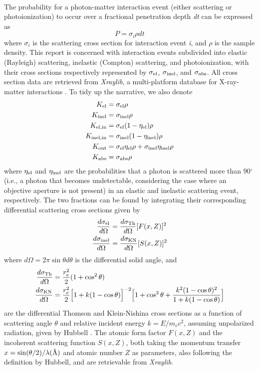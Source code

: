 \documentclass[review]{elsarticle}
\newcommand\el{\textup{\scriptsize{el}}}
\newcommand\inel{\textup{\scriptsize{inel}}}
\newcommand\elin{\textup{\scriptsize{el,in}}}
\newcommand\inelin{\textup{\scriptsize{inel,in}}}
\newcommand\out{\textup{\scriptsize{out}}}
\newcommand\PI{\textup{\scriptsize{abs}}}
\newcommand\Th{\textup{\scriptsize{Th}}}
\newcommand\KN{\textup{\scriptsize{KN}}}
\newcommand\angstrom{\mbox{\normalfont\AA}}
\begin{document}
\paragraph{} The probability for a photon-matter interaction event (either scattering or photoionization) to occur over a fractional penetration depth \textit{dt} can be expressed as
\begin{equation}
P = \sigma_{i} \rho dt
\end{equation}
where $\sigma_{i}$ is the scattering cross section for interaction event \textit{i}, and $\rho$ is the sample density. This report is concerned with interaction events subdivided into elastic (Rayleigh) scattering, inelastic (Compton) scattering, and photoionization, with their cross sections respectively represented by $\sigma_{\el}$, $\sigma_{\inel}$, and $\sigma_{\PI}$. All cross section data are retrieved from \textit{Xraylib}, a multi-platform database for X-ray-matter interactions \cite{Schoonjans:2011km}. To tidy up the narrative, we also denote
\begin{align}
K_{\el} &= \sigma_{\el}\rho \\
K_{\inel} &= \sigma_{\inel}\rho \\
K_{\elin} &= \sigma_{\el}(1-\eta_\el)\rho \\
K_{\inelin} &= \sigma_{\inel}(1-\eta_\inel)\rho
\label{eq:inelin} \\
K_{\out} &= \sigma_{\el}\eta_\el\rho + \sigma_{\inel}\eta_\inel\rho \\
K_{\PI} &= \sigma_{\PI}\rho
\end{align}
where $\eta_\el$ and $\eta_\inel$ are the probabilities that a photon is scattered more than 90$^\circ$ (i.e., a photon that becomes undetectable, considering the case where an objective aperture is not present) in an elastic and inelastic scattering event, respectively. The two fractions can be found by integrating their corresponding differential scattering cross sections given by \cite{Sun:2015fr}
\begin{align}
\frac{d\sigma_\el}{d\Omega} &= \frac{d\sigma_\Th}{d\Omega}[F(x,Z)]^2 \\
\frac{d\sigma_\inel}{d\Omega} &= \frac{d\sigma_\KN}{d\Omega}[S(x,Z)]^2
\label{eq:kndiff}
\end{align}
where $d\Omega = 2\pi\sin\theta d\theta$ is the differential solid angle, and 
\begin{align}
\frac{d\sigma_\Th}{d\Omega} &= \frac{r_e^2}{2}(1+\cos^2\theta) \\
\frac{d\sigma_\KN}{d\Omega} &= \frac{r_e^2}{2}\Big[1 + k(1-\cos\theta)\Big]^{-2}\Big[1 + \cos^2\theta + \frac{k^2(1-\cos\theta)^2}{1+k(1-\cos\theta)}\Big]
\end{align}
are the differential Thomson and Klein-Nishina cross sections as a function of scattering angle $\theta$ and relative incident energy $k = E/m_e c^2$, assuming unpolarized radiation, given by Hubbell \cite{Hubbell:107568}. The atomic form factor $F(x,Z)$ and the incoherent scattering function $S(x,Z)$, both taking the momentum transfer $x = \sin(\theta/2)/\lambda(\angstrom)$ and atomic number $Z$ as parameters, also following the definition by Hubbell, and are retrievable from \textit{Xraylib}. 
\end{document}
